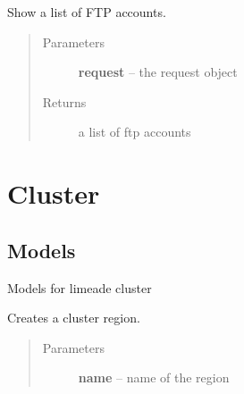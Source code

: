 \documentclass[letterpaper,10pt,english]{sphinxmanual}
\begin{document}

\begin{fulllineitems}
\label{api/ftp:limeade.ftp.views.account_list}
Show a list of FTP accounts.
\begin{quote}\begin{description}
\item[{Parameters}] \leavevmode
\textbf{request} -- the request object

\item[{Returns}] \leavevmode
a list of ftp accounts

\end{description}\end{quote}

\end{fulllineitems}



\section{Cluster}
\label{api/cluster:cluster}\label{api/cluster::doc}

\subsection{Models}
\label{api/cluster:models}\label{api/cluster:module-limeade.cluster.models}
Models for limeade cluster

\begin{fulllineitems}
\label{api/cluster:limeade.cluster.models.Region}
Creates a cluster region.
\begin{quote}\begin{description}
\item[{Parameters}] \leavevmode
\textbf{name} -- name of the region

\end{description}\end{quote}

\end{fulllineitems}

\end{document}
